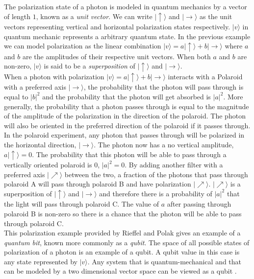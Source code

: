 \documentclass[12pt]{article}   	%
\begin{document}
The polarization state of a photon is modeled in quantum mechanics by a vector of length $1$, known as a \textit{unit vector}. We can write $|\uparrow\rangle$ and $|\rightarrow \rangle$ as the unit vectors representing vertical and horizontal polarization states respectively. $|v \rangle$ in quantum mechanic represents a arbitrary quantum state. In the previous example we can model polarization as the linear combination $|v \rangle=a|\uparrow\rangle+b|\rightarrow \rangle$ where $a$ and $b$ are the amplitudes of their respective unit vectors. When both $a$ and $b$ are non-zero, $|v \rangle$ is said to be a \textit{superposition} of $|\uparrow\rangle$ and $|\rightarrow \rangle$.\\ 
When a photon with polarization $|v \rangle=a|\uparrow\rangle+b|\rightarrow \rangle$ interacts with a Polaroid with a preferred axis $|\rightarrow \rangle$, the probability that the photon will pass through is equal to $|b|^2$ and the probability that the photon will get absorbed is $|a|^2$. More generally, the probability that a photon passes through is equal to the magnitude of the amplitude of the polarization in the direction of the polaroid.  The photon will also be oriented in the preferred direction of the polaroid if it passes through. \\
In the polaroid experiment, any photon that passes through will be polarized in the horizontal direction, $|\rightarrow \rangle$. The photon now has a no vertical amplitude, $a|\uparrow\rangle=0$. The probability that this photon will be able to pass through a vertically oriented polaroid is 0, $|a|^2=0$. By adding another filter with a preferred axis $|\nearrow \rangle$ between the two, a fraction of the photons that pass through polaroid A will pass through polaroid B and have polarization $|\nearrow \rangle$. $|\nearrow \rangle$ is a superposition of $|\uparrow\rangle$ and $|\rightarrow \rangle$ and therefore there is a probability of $|a|^2$ that the light will pass through polaroid C. The value of $a$ after passing through polaroid B is non-zero so there is a chance that the photon will be able to pass through polaroid C. \\
This polarization example provided by Rieffel and Polak gives  an example of a \textit{quantum bit}, known more commonly as a \textit{qubit}. The space of all possible states of polarization of a photon is an example of a qubit. A qubit value in this case is any state represented by $|v \rangle$. Any system that is quantum-mechanical and that can be modeled by a two dimensional vector space can be viewed as a qubit \cite{2QUANTINTRO}.
\end{document}
